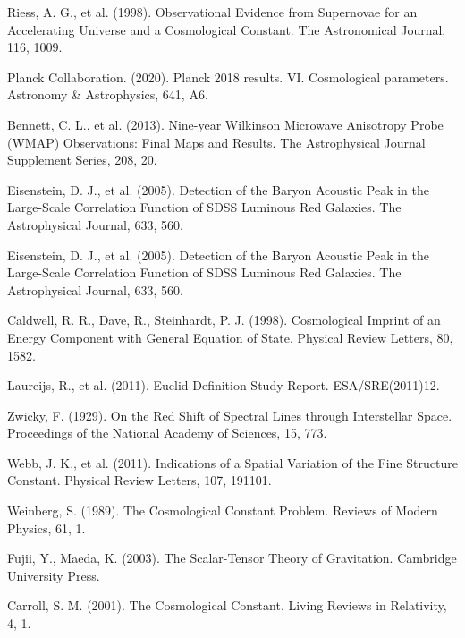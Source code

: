 \documentclass[a4paper,12pt]{article}
\begin{document}
\begin{thebibliography}{99}
		 Riess, A. G., et al. (1998). Observational Evidence from Supernovae for an Accelerating Universe and a Cosmological Constant. The Astronomical Journal, 116, 1009.
		
		 Planck Collaboration. (2020). Planck 2018 results. VI. Cosmological parameters. Astronomy \& Astrophysics, 641, A6.
		
		 Bennett, C. L., et al. (2013). Nine-year Wilkinson Microwave Anisotropy Probe (WMAP) Observations: Final Maps and Results. The Astrophysical Journal Supplement Series, 208, 20.
		
		 Eisenstein, D. J., et al. (2005). Detection of the Baryon Acoustic Peak in the Large-Scale Correlation Function of SDSS Luminous Red Galaxies. The Astrophysical Journal, 633, 560.
		
		 Eisenstein, D. J., et al. (2005). Detection of the Baryon Acoustic Peak in the Large-Scale Correlation Function of SDSS Luminous Red Galaxies. The Astrophysical Journal, 633, 560.
		
		 Caldwell, R. R., Dave, R., Steinhardt, P. J. (1998). Cosmological Imprint of an Energy Component with General Equation of State. Physical Review Letters, 80, 1582.
		
		 Laureijs, R., et al. (2011). Euclid Definition Study Report. ESA/SRE(2011)12.
		
		 Zwicky, F. (1929). On the Red Shift of Spectral Lines through Interstellar Space. Proceedings of the National Academy of Sciences, 15, 773.
		
		 Webb, J. K., et al. (2011). Indications of a Spatial Variation of the Fine Structure Constant. Physical Review Letters, 107, 191101.
		
		 Weinberg, S. (1989). The Cosmological Constant Problem. Reviews of Modern Physics, 61, 1.
		
		 Fujii, Y., Maeda, K. (2003). The Scalar-Tensor Theory of Gravitation. Cambridge University Press.
		
		 Carroll, S. M. (2001). The Cosmological Constant. Living Reviews in Relativity, 4, 1.
	\end{thebibliography}
\end{document}

